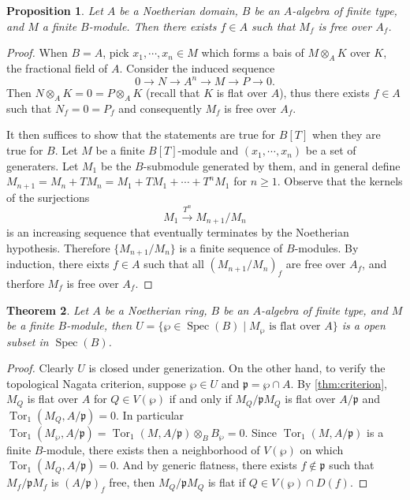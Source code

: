 \documentclass[leqno]{amsart}
\DeclareMathOperator{\Spec}{Spec}
\newcommand{\1}{\mathbf{1}}
\newcommand{\fp}{\mathfrak p}
\DeclareMathOperator{\Tor}{Tor}
\newtheorem{thm}{Theorem}[section]
\newtheorem{prop}[thm]{Proposition}
\theoremstyle{definition}
\theoremstyle{remark}
\begin{document}
\begin{prop}
	Let $A$ be a Noetherian domain,
	$B$ be an $A$-algebra of finite type,
	and $M$ a finite $B$-module.
	Then there exists $f\in A$
	such that  $M_f$ is free over $A_f$.
\end{prop}
\begin{proof}
	When $B=A$,
	pick $x_1,\cdots,x_n\in M$
	which forms a bais of
	$M\otimes_AK$ over  $K$,
	the fractional field of  $A$.
	Consider the induced sequence
	\[
		0\to N\to A^n\to M\to P\to 0.
	\]
	Then $N\otimes_AK=0=P\otimes_AK$
	(recall that $K$ is flat over  $A$),
	thus there exists $f\in A$ such that $N_f=0=P_f$
	and consequently $M_f$ is free over  $A_f$.

	It then suffices to show that 
	the statements are true for $B[T]$ when
	they are true for  $B$.
	Let $M$ be a finite  $B[T]$-module
	and $(x_1,\cdots,x_n)$ be a set of generaters.
	Let $M_1$ be the $B$-submodule generated by them,
	and in general define 
	$M_{n+1}=M_n+TM_n=M_1+TM_1+\cdots+T^nM_1$ for $n\geq 1$.
	Observe that the kernels of the surjections
	\[
		M_1\xrightarrow{T^n} M_{n+1}/M_n
	\]
	is an increasing sequence that eventually terminates
	by the Noetherian hypothesis.
	Therefore $\{M_{n+1}/M_n\}$ is a finite sequence
	of $B$-modules. 
	By induction, there eixts  $f\in A$
	such that  all  $(M_{n+1}/M_n)_f$ are free over $A_f$,
	and therfore  $M_f$ is free over  $A_f$.
\end{proof}

\begin{thm}
	Let $A$ be a Noetherian ring,
	$B$ be an  $A$-algebra of finite type,
	and $M$ be a finite $B$-module,
	then  
	$U=\{\wp\in \Spec(B)\mid M_\wp \text{ is flat over }A\}$ 
	is a open subset in $\Spec(B)$.
\end{thm}
\begin{proof}
	Clearly $U$ is closed under generization.
	On the other hand,
	to verify the topological Nagata criterion, suppose
	$\wp\in U$ and  $\fp=\wp\cap A$.
	By \ref{thm:criterion},
	$M_Q$ is flat over  $A$
	for $Q\in V(\wp)$ if and only if 
	$M_Q/\fp M_Q$ is flat over $A/\fp$
	and $\Tor_1(M_Q,A/\fp)=0$.
	In particular 
	$\Tor_1(M_\wp,A/\fp)=\Tor_1(M,A/\fp)\otimes_BB_\wp=0$.
	Since $\Tor_1(M,A/\fp)$ is a finite $B$-module,
	there exists then a neighborhood of $V(\wp)$
	on which $\Tor_1(M_Q,A/\fp)=0$.
	And by generic flatness, there exists  $f\notin\fp$
	such that  $M_f/\fp M_f$ is  $(A/\fp)_f$ free,
	then  $M_Q/\fp M_Q$ is flat if $Q\in V(\wp)\cap D(f)$.
\end{proof}
\end{document}
